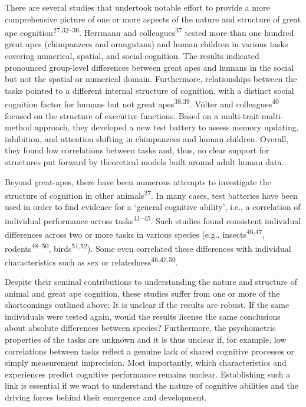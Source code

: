 \documentclass[
  man,floatsintext]{apa6}
\begin{document}
There are several studies that undertook notable effort to provide a more comprehensive picture of one or more aspects of the nature and structure of great ape cognition\textsuperscript{27,32--36}. Herrmann and colleagues\textsuperscript{37} tested more than one hundred great apes (chimpanzees and orangutans) and human children in various tasks covering numerical, spatial, and social cognition. The results indicated pronounced group-level differences between great apes and humans in the social but not the spatial or numerical domain. Furthermore, relationships between the tasks pointed to a different internal structure of cognition, with a distinct social cognition factor for humans but not great apes\textsuperscript{38,39}. Völter and colleagues\textsuperscript{40} focused on the structure of executive functions. Based on a multi-trait multi-method approach, they developed a new test battery to assess memory updating, inhibition, and attention shifting in chimpanzees and human children. Overall, they found low correlations between tasks and, thus, no clear support for structures put forward by theoretical models built around adult human data.

Beyond great-apes, there have been numerous attempts to investigate the structure of cognition in other animals\textsuperscript{27}. In many cases, test batteries have been used in order to find evidence for a `general cognitive ability', i.e., a correlation of individual performance across tasks\textsuperscript{41--45}. Such studies found consistent individual differences across two or more tasks in various species (e.g., insects\textsuperscript{46,47}, rodents\textsuperscript{48--50}, birds\textsuperscript{51,52}). Some even correlated these differences with individual characteristics such as sex or relatedness\textsuperscript{46,47,50}.

Despite their seminal contributions to understanding the nature and structure of animal and great ape cognition, these studies suffer from one or more of the shortcomings outlined above: It is unclear if the results are robust. If the same individuals were tested again, would the results license the same conclusions about absolute differences between species? Furthermore, the psychometric properties of the tasks are unknown and it is thus unclear if, for example, low correlations between tasks reflect a genuine lack of shared cognitive processes or simply measurement imprecision. Most importantly, which characteristics and experiences predict cognitive performance remains unclear. Establishing such a link is essential if we want to understand the nature of cognitive abilities and the driving forces behind their emergence and development.
\end{document}
